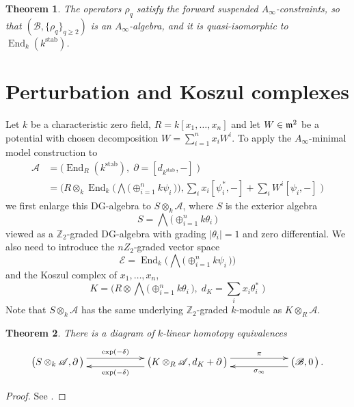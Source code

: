 \documentclass[english,letter paper,12pt,leqno]{article}
\newtheorem{theorem}{Theorem}[section]
\theoremstyle{example}
\numberwithin{equation}{section}
\def\stab{\operatorname{stab}}
\def\be{\begin{equation}}
\def\ee{\end{equation}}
\def\nZ{\mathds{Z}}
\DeclareMathOperator{\End}{End}
\begin{document}
\begin{theorem} The operators $\rho_q$ satisfy the forward suspended $A_\infty$-constraints, so that $(\mathscr{B}, \{ \rho_q \}_{q \ge 2})$ is an $A_\infty$-algebra, and it is quasi-isomorphic to $\End_k(k^{\stab})$.
\end{theorem}

\section{Perturbation and Koszul complexes}

Let $k$ be a characteristic zero field, $R =  k[x_1,\ldots,x_n]$ and let $W \in \mathfrak{m}^2$ be a potential with chosen decomposition $W = \sum_{i=1}^n x_i W^i$. To apply the $A_\infty$-minimal model construction to
\begin{align*}
\mathscr{A} &= \Big( \End_{R}(k^{\operatorname{stab}}), \; \partial = [d_{k^{\stab}},-] \; \Big)\\
&= \Big( R \otimes_k \End_k\Big( \bigwedge\big( \oplus_{i=1}^n k\psi_i \,\big) \Big),  \sum_i x_i [\psi_i^*,-] + \sum_i W^i [\psi_i,-] \;\Big)
\end{align*}
we first enlarge this DG-algebra to $S \otimes_k \mathscr{A}$, where $S$ is the exterior algebra
\be
S = \bigwedge\big( \oplus_{i=1}^n k\theta_i \,\big)
\ee
viewed as a $\nZ_2$-graded DG-algebra with grading $|\theta_i| = 1$ and zero differential. We also need to introduce the $nZ_2$-graded vector space
\be
\mathscr{E} = \End_k\Big( \bigwedge\big( \oplus_{i=1}^n k \psi_i \,\big) \Big)
\ee
and the Koszul complex of $x_1,\ldots,x_n$,
\be\label{eq:defnkoszulK}
K = \Big( R \otimes \bigwedge\big( \oplus_{i=1}^n k \theta_i \,\big), \; d_K = \sum_i x_i \theta_i^*\; \Big)
\ee
Note that $S \otimes_k \mathscr{A}$ has the same underlying $\nZ_2$-graded $k$-module as $K \otimes_R \mathscr{A}$.

\begin{theorem} There is a diagram of $k$-linear homotopy equivalences
\be\label{eq:first_he}
\xymatrix@C+3pc{
\big( S \otimes_k \mathscr{A}, \partial \,\big) \ar@<1ex>[r]^-{\exp(-\delta)} & \big( K \otimes_R \mathscr{A}, d_K + \partial \,\big) \ar@<1ex>[l]^-{ \exp(-\delta) } \ar@<1ex>[r]^-{\pi} & \big( \mathscr{B}, 0 \,\big)\,.\ar@<1ex>[l]^-{ \sigma_\infty }
}
\ee
\end{theorem}
\begin{proof}
See \cite{murfet}.
\end{proof}
\end{document}
